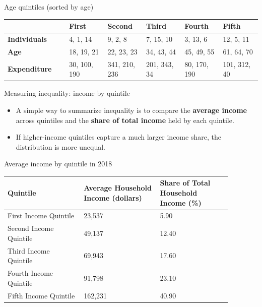 \documentclass[aspectratio=169]{beamer}
\begin{document}
\begin{frame}{Age quintiles (sorted by age)}
\transfade
\begin{center}
\scriptsize
\setlength{\tabcolsep}{2pt}
\renewcommand{\arraystretch}{1.1}
\begin{tabular}{p{0.24\linewidth} p{0.152\linewidth} p{0.152\linewidth} p{0.152\linewidth} p{0.152\linewidth} p{0.152\linewidth}}
\toprule
& \textbf{First} & \textbf{Second} & \textbf{Third} & \textbf{Fourth} & \textbf{Fifth} \\
\midrule
\textbf{Individuals} & 4, 1, 14 & 9, 2, 8 & 7, 15, 10 & 3, 13, 6 & 12, 5, 11 \\
\textbf{Age} & 18, 19, 21 & 22, 23, 23 & 34, 43, 44 & 45, 49, 55 & 61, 64, 70 \\
\textbf{Expenditure} & 30, 100, 190 & 341, 210, 236 & 201, 343, 34 & 80, 170, 190 & 101, 312, 40 \\
\bottomrule
\end{tabular}
\end{center}
\end{frame}

\begin{frame}{Measuring inequality: income by quintile}
\transfade
\begin{itemize}
\item A simple way to summarize inequality is to compare the \textbf{average income} across quintiles and the \textbf{share of total income} held by each quintile.
\item If higher-income quintiles capture a much larger income share, the distribution is more unequal.
\end{itemize}
\end{frame}

\begin{frame}{Average income by quintile in 2018}
\transfade
\begin{center}
\small
\begin{tabular}{p{0.3\linewidth} p{0.30\linewidth} p{0.28\linewidth}}
\toprule
\textbf{Quintile} & \textbf{Average Household Income (dollars)} & \textbf{Share of Total Household Income (\%)} \\
\midrule
First Income Quintile & 23{,}537 & 5.90 \\
Second Income Quintile & 49{,}137 & 12.40 \\
Third Income Quintile & 69{,}943 & 17.60 \\
Fourth Income Quintile & 91{,}798 & 23.10 \\
Fifth Income Quintile & 162{,}231 & 40.90 \\
\bottomrule
\end{tabular}
\end{center}
\end{frame}
\end{document}
